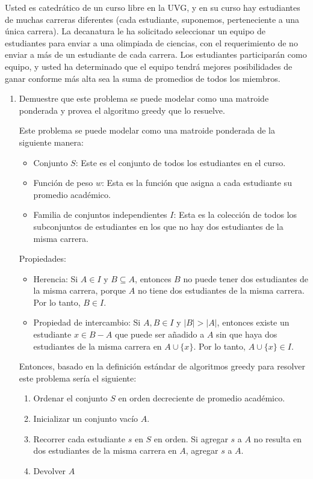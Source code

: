 \begin{problema}
    Usted es catedrático de un curso libre en la UVG, y en su curso hay estudiantes de muchas carreras diferentes (cada estudiante, suponemos, perteneciente a una única carrera). La decanatura le ha solicitado seleccionar un equipo de estudiantes para enviar a una olimpiada de ciencias, con el requerimiento de no enviar a más de un estudiante de cada carrera. Los estudiantes participarán como equipo, y usted ha determinado que el equipo tendrá mejores posibilidades de ganar conforme más alta sea la suma de promedios de todos los miembros.
    \begin{enumerate}
        \item Demuestre que este problema se puede modelar como una matroide ponderada y provea el algoritmo greedy que lo resuelve.
        \begin{sol}
            Este problema se puede modelar como una matroide ponderada de la siguiente manera:
            \begin{itemize}
                \item Conjunto $S$: Este es el conjunto de todos los estudiantes en el curso.
                \item Función de peso $w$: Esta es la función que asigna a cada estudiante su promedio académico.
                \item Familia de conjuntos independientes $I$: Esta es la colección de todos los subconjuntos de estudiantes en los que no hay dos estudiantes de la misma carrera.
                
            \end{itemize}


Propiedades:
\begin{itemize}
    \item Herencia: Si $A \in I$ y $B \subseteq A$, entonces $B$ no puede tener dos estudiantes de la misma carrera, porque $A$ no tiene dos estudiantes de la misma carrera. Por lo tanto, $B \in I$.
    \item Propiedad de intercambio: Si $A, B \in I$ y $|B| > |A|$, entonces existe un estudiante $x \in B - A$ que puede ser añadido a $A$ sin que haya dos estudiantes de la misma carrera en $A \cup \{x\}$. Por lo tanto, $A \cup \{x\} \in I$.
\end{itemize}


Entonces, basado en la definición estándar de algoritmos greedy para resolver este problema sería el siguiente:
\begin{enumerate}
    \item Ordenar el conjunto $S$ en orden decreciente de promedio académico.
    \item Inicializar un conjunto vacío $A$.
    \item Recorrer cada estudiante $s$ en $S$ en orden. Si agregar $s$ a $A$ no resulta en dos estudiantes de la misma carrera en $A$, agregar $s$ a $A$.
    \item Devolver $A$
\end{enumerate}


\end{sol}
\end{enumerate}
\end{problema}
